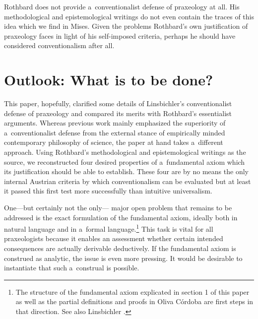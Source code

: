 Rothbard does not provide a~conventionalist defense of praxeology at all. His methodological and epistemological writings do not even contain the traces of this idea which we find in Mises. Given the problems Rothbard's own justification of praxeology faces in light of his self-imposed criteria, perhaps he should have considered conventionalism after all.



\section{Outlook: What is to be done?}

This paper, hopefully, clarified some details of Linsbichler's conventionalist defense of praxeology and compared its merits with Rothbard's essentialist arguments. Whereas previous work 
\parencites[][]{linsbichler_was_2017}[][]{linsbichler_austrian_2021}[][]{lipski_austrian_2021}[][]{scheall_review_2017}[][]{tokumaru_review_2018} %
 mainly emphasized the superiority of a~conventionalist defense from the external stance of empirically minded contemporary philosophy of science, the paper at hand takes a~different approach. Using Rothbard's methodological and epistemological writings as the source, we reconstructed four desired properties of a~fundamental axiom which its justification should be able to establish. These four are by no means the only internal Austrian criteria by which conventionalism can be evaluated but at least it passed this first test more successfully than intuitive universalism.



One---but certainly not the only--- major open problem that remains to be addressed is the exact formulation of the fundamental axiom, ideally both in natural language and in a~formal language.\footnote{The structure of the fundamental axiom explicated in section 1 of this paper as well as the partial definitions and proofs in Oliva Córdoba 
\parencite*[][]{} %
 are first steps in that direction. See also Linsbichler 
\parencite*[][]{linsbichler_case_2023}.%
} This task is vital for all praxeologists because it enables an assessment whether certain intended consequences are actually derivable deductively. If the fundamental axiom is construed as analytic, the issue is even more pressing. It would be desirable to instantiate that such a~construal is possible.



